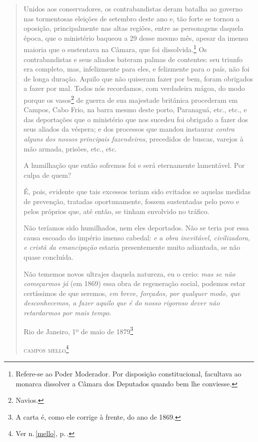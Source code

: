 \begin{quote}
Unidos aos conservadores, os contrabandistas deram batalha ao governo
nas tormentosas eleições de setembro deste ano e, tão forte se tornou a
oposição, principalmente nas altas regiões, entre as personagens daquela
época, que o ministério baqueou a 29 desse mesmo mês, apesar da imensa
maioria que o sustentava na Câmara, que foi dissolvida.\footnote{
  Refere-se ao Poder Moderador. Por disposição constitucional,
  facultava ao monarca dissolver a Câmara dos Deputados quando bem lhe
  conviesse.} Os contrabandistas e seus aliados bateram palmas de
contentes: seu triunfo era completo, mas, infelizmente para eles, e
felizmente para o país, não foi de longa duração. Aquilo que não
quiseram fazer por bem, foram obrigados a fazer por mal. Todos nós
recordamos, com verdadeira mágoa, do modo porque os vasos\footnote{
  Navios.} de guerra de sua majestade britânica procederam em Campos,
Cabo Frio, na barra mesmo deste porto, Paranaguá, etc., etc., e das
deportações que o ministério que nos sucedeu foi obrigado a fazer dos
seus aliados da véspera; e dos processos que mandou instaurar
\emph{contra alguns dos nossos principais fazendeiros}, precedidos de
buscas, varejos à mão armada, prisões, etc., etc.

A humilhação que então sofremos foi e será eternamente lamentável. Por
culpa de quem?

É, pois, evidente que tais excessos teriam sido evitados se aquelas
medidas de prevenção, tratadas oportunamente, fossem sustentadas pelo
povo e pelos próprios que, até então, se tinham envolvido no tráfico.

Não teríamos sido humilhados, nem eles deportados. Não se teria por essa
causa escoado do império imenso cabedal: \emph{e a obra inevitável,
civilizadora, e cristã da emancipação} estaria presentemente muito
adiantada, se não quase concluída.

Não tememos novos ultrajes daquela natureza, eu o creio: \emph{mas se
não começarmos já} (em 1869) essa obra de regeneração social, podemos
estar certíssimos de que seremos, \emph{em breve, forçados, por qualquer
modo, que desconhecemos, a fazer aquilo que é do nosso rigoroso dever
não retardarmos por mais tempo}.\medskip

\hfill{}Rio de Janeiro, 1º de maio de 1879\footnote{A carta é, como ele corrige à
  frente, do ano de 1869.}

\hfill\textsc{campos mello}\footnote{Ver n.\,\ref{mello}, p.\,\pageref{mello}.}
\end{quote}  

